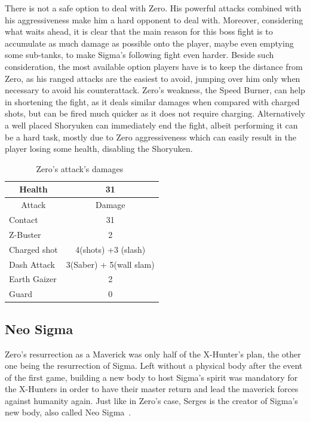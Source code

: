 There is not a safe option to deal with Zero. His powerful attacks combined with his aggressiveness make him a hard opponent to deal with. Moreover, considering what waits ahead, it is clear that the main reason for this boss fight is to accumulate as much damage as possible onto the player, maybe even emptying some sub-tanks, to make Sigma's following fight even harder. Beside such consideration, the most available option players have is to keep the distance from Zero, as his ranged attacks are the easiest to avoid, jumping over him only when necessary to avoid his counterattack. Zero's weakness, the Speed Burner, can help in shortening the fight, as it deals similar damages when compared with charged shots, but can be fired much quicker as it does not require charging. Alternatively a well placed Shoryuken can immediately end the fight, albeit performing it can be a hard task, mostly due to Zero aggressiveness which can easily result in the player losing some health, disabling the Shoryuken.
\begin{table}[htp]
	\centering
	\begin{tabular}[h]{l c}
		\toprule
		\multicolumn{1}{c}{Health}  & 31 \\
		\midrule
		\multicolumn{1}{c}{Attack} & \multicolumn{1}{c}{Damage}\\
		Contact & 31\\
		Z-Buster & 2\\
		Charged shot&4(shots) +3 (slash) \\
		Dash Attack & 3(Saber) + 5(wall slam)\\
		Earth Gaizer & 2\\
		Guard & 0\\
		\bottomrule
	\end{tabular}
	\caption{Zero's attack's damages~\cite{wiki:Zero_X2}}
\end{table}
\subsection{Neo Sigma}\label{boss:Sigma_x2}

Zero's resurrection as a Maverick was only half of the X-Hunter's plan, the other one being the resurrection of Sigma. Left without a physical body after the event of the first game, building a new body to host Sigma's spirit was mandatory for the X-Hunters in order to have their master return and lead the maverick forces against humanity again. Just like in Zero's case, Serges is the creator of Sigma's new body, also called Neo Sigma~\cite{wayback:X2_resources}. 

